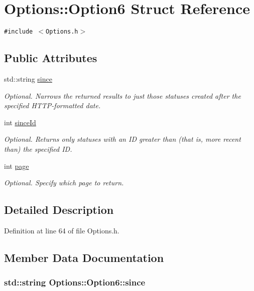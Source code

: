 \hypertarget{structOptions_1_1Option6}{
\section{Options::Option6 Struct Reference}
\label{structOptions_1_1Option6}
}
{\tt \#include $<$Options.h$>$}

\subsection*{Public Attributes}
\begin{CompactItemize}
\item 
std::string \hyperlink{structOptions_1_1Option6_be08b5d846807eee9406bc13db26d19b}{since}
\begin{CompactList}\small\item\em Optional. Narrows the returned results to just those statuses created after the specified HTTP-formatted date. \item\end{CompactList}\item 
int \hyperlink{structOptions_1_1Option6_a6563c79abda8f378cab3b5767aecf54}{sinceId}
\begin{CompactList}\small\item\em Optional. Returns only statuses with an ID greater than (that is, more recent than) the specified ID. \item\end{CompactList}\item 
int \hyperlink{structOptions_1_1Option6_72e8612312c4d7b09a6a2611bddd38df}{page}
\begin{CompactList}\small\item\em Optional. Specify which page to return. \item\end{CompactList}\end{CompactItemize}


\subsection{Detailed Description}


Definition at line 64 of file Options.h.

\subsection{Member Data Documentation}
\hypertarget{structOptions_1_1Option6_be08b5d846807eee9406bc13db26d19b}{
\subsubsection{\setlength{\rightskip}{0pt plus 5cm}std::string {\bf Options::Option6::since}}}
\label{structOptions_1_1Option6_be08b5d846807eee9406bc13db26d19b}


